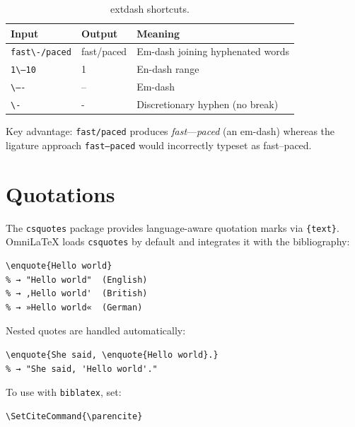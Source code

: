 \begin{table}[htbp]
  \centering
  \caption{extdash shortcuts.}
  \label{tab:extdash}
  \begin{tabular}{@{}lll@{}}
    \toprule
    Input                       & Output            & Meaning \\
    \midrule
    \texttt{fast\textbackslash-/paced} & fast\-/paced & Em-dash joining hyphenated words \\
    \texttt{1\textbackslash--10}       & 1\--10       & En-dash range \\
    \texttt{\textbackslash--{}-}       & --          & Em-dash \\
    \texttt{\textbackslash-}           & -            & Discretionary hyphen (no break) \\
    \bottomrule
  \end{tabular}
\end{table}

Key advantage: \texttt{fast\-/paced} produces \emph{fast}—\emph{paced}
(an em-dash) whereas the ligature approach \texttt{fast--paced} would
incorrectly typeset as fast--paced.

\section{Quotations}

The \texttt{csquotes} package provides language-aware quotation marks via
\texttt{\{text\}}.  OmniLaTeX loads \texttt{csquotes} by
default and integrates it with the bibliography:

\begin{verbatim}
\enquote{Hello world}
% → "Hello world"  (English)
% → ,Hello world'  (British)
% → »Hello world«  (German)
\end{verbatim}

Nested quotes are handled automatically:

\begin{verbatim}
\enquote{She said, \enquote{Hello world}.}
% → "She said, 'Hello world'."
\end{verbatim}

To use  with \texttt{biblatex}, set:

\begin{verbatim}
\SetCiteCommand{\parencite}
\end{verbatim}

